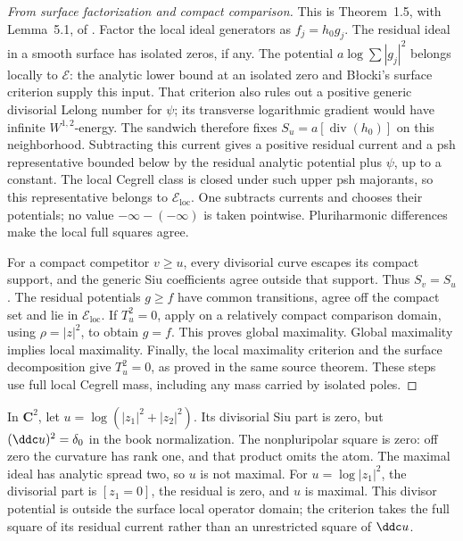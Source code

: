 \begin{proof}[From surface factorization and compact comparison]
This is Theorem~1.5, with Lemma~5.1, of
\cite{DoHiep26LocalComparisonV1}.
Factor the local ideal generators as \(f_j=h_0g_j\).
The residual ideal in a smooth surface has isolated zeros, if any.
The potential \(a\log\sum|g_j|^2\) belongs locally to
\(\mathcal E\): the analytic lower bound at an isolated zero
and Błocki's surface criterion
\cite[Theorems~1.1 and~4.1]{Blocki04C2Published} supply this input.
That criterion also rules out a positive generic divisorial
Lelong number for \(\psi\); its transverse logarithmic gradient
would have infinite \(W^{1,2}\)-energy.
The sandwich therefore fixes
\(S_u=a[\operatorname{div}(h_0)]\) on this neighborhood.
Subtracting this current gives a positive residual current and
a psh representative bounded below by the residual analytic
potential plus \(\psi\), up to a constant. The local Cegrell
class is closed under such upper psh majorants, so this representative
belongs to \(\mathcal E_{\mathrm{loc}}\).
One subtracts currents and chooses their potentials; no value
\(-\infty-(-\infty)\) is taken pointwise. Pluriharmonic differences
make the local full squares agree.

For a compact competitor \(v\geq u\), every divisorial curve
escapes its compact support, and the generic Siu coefficients
agree outside that support. Thus \(S_v=S_u\). The residual
potentials \(g\geq f\) have common transitions, agree off the
compact set and lie in \(\mathcal E_{\mathrm{loc}}\).
If \(T_u^2=0\), apply
 on a relatively compact
comparison domain, using \(\rho=|z|^2\), to obtain \(g=f\).
This proves global maximality. Global maximality implies local
maximality. Finally, the local maximality criterion and the
surface decomposition give \(T_u^2=0\), as proved in the
same source theorem. These steps use full local Cegrell mass,
including any mass carried by isolated poles.
\end{proof}

\begin{example}
\label{ex:appH-full-residual-poles}
In \(\mathbf C^2\), let
\(u=\log(|z_1|^2+|z_2|^2)\). Its divisorial Siu part is zero,
but \((\ddc u)^2=\delta_0\) in the book normalization.
The nonpluripolar square is zero: off zero the curvature has
rank one, and that product omits the atom. The maximal ideal
has analytic spread two, so \(u\) is not maximal.
For \(u=\log|z_1|^2\), the divisorial part is
\([z_1=0]\), the residual is zero, and \(u\) is maximal.
This divisor potential is outside the surface local operator
domain; the criterion takes the full square of its residual
current rather than an unrestricted square of \(\ddc u\).
\end{example}

